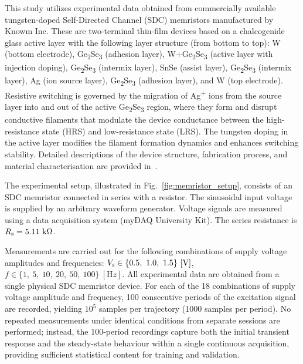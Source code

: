 \documentclass{ieeeaccess}
\begin{document}
This study utilizes experimental data obtained from commercially available tungsten-doped Self-Directed Channel (SDC) memristors manufactured by Knowm Inc. These are two-terminal thin-film devices based on a chalcogenide glass active layer with the following layer structure (from bottom to top): W (bottom electrode), Ge\textsubscript{2}Se\textsubscript{3} (adhesion layer), W+Ge\textsubscript{2}Se\textsubscript{3} (active layer with injection doping), Ge\textsubscript{2}Se\textsubscript{3} (intermix layer), SnSe (assist layer), Ge\textsubscript{2}Se\textsubscript{3} (intermix layer), Ag (ion source layer), Ge\textsubscript{2}Se\textsubscript{3} (adhesion layer), and W (top electrode). Resistive switching is governed by the migration of Ag\textsuperscript{+} ions from the source layer into and out of the active Ge\textsubscript{2}Se\textsubscript{3} region, where they form and disrupt conductive filaments that modulate the device conductance between the high-resistance state (HRS) and low-resistance state (LRS). The tungsten doping in the active layer modifies the filament formation dynamics and enhances switching stability. Detailed descriptions of the device structure, fabrication process, and material characterisation are provided in~\cite{Campbell2017,Garda2024,Hajto2025}. 


The experimental setup, illustrated in Fig.~\ref{fig:memristor_setup}, consists of an SDC memristor connected in series with a resistor. The sinusoidal input voltage is supplied by an arbitrary waveform generator. Voltage signals are measured using a data acquisition system (myDAQ University Kit). The series resistance is \(R_{\mathrm s} = 5.11~\mathrm{k\Omega}\).

Measurements are carried out for the following combinations of supply voltage amplitudes and frequencies: \(V_{\mathrm s}  \in \{0.5,\ 1.0,\ 1.5\}~[{\mathrm V}]\), \(f \in \{1,\ 5,\ 10,\ 20,\ 50,\ 100\}~[\mathrm Hz]\). All experimental data are obtained from a single physical SDC memristor device. For each of the 18 combinations of supply voltage amplitude and frequency, 100 consecutive periods of the excitation signal are recorded, yielding \(10^5\) samples per trajectory (1000 samples per period). No repeated measurements under identical conditions from separate sessions are performed; instead, the 100-period recordings capture both the initial transient response and the steady-state behaviour within a single continuous acquisition, providing sufficient statistical content for training and validation.
\end{document}
